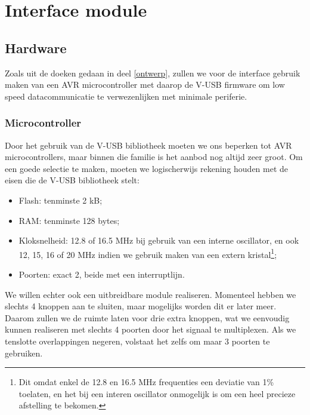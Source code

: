\documentclass[verslag.tex]{subfiles}
\begin{document}
\part{Interface module}
\label{interface}

\chapter{Hardware}

Zoals uit de doeken gedaan in deel \ref{ontwerp}, zullen we voor de interface gebruik maken van een AVR microcontroller met daarop de V-USB firmware om low speed datacommunicatie te verwezenlijken met minimale periferie.

\section{Microcontroller}

Door het gebruik van de V-USB bibliotheek moeten we ons beperken tot AVR microcontrollers, maar binnen die familie is het aanbod nog altijd zeer groot. Om een goede selectie te maken, moeten we logischerwijs rekening houden met de eisen die de V-USB bibliotheek stelt:
\begin{itemize}
\item Flash: tenminste 2 kB;
\item RAM: tenminste 128 bytes;
\item Kloksnelheid: 12.8 of 16.5 MHz bij gebruik van een interne oscillator, en ook 12, 15, 16 of 20 MHz indien we gebruik maken van een extern kristal\footnote{Dit omdat enkel de 12.8 en 16.5 MHz frequenties een deviatie van 1\% toelaten, en het bij een interen oscillator onmogelijk is om een heel precieze afstelling te bekomen.};
\item Poorten: exact 2, beide met een interruptlijn.
\end{itemize}

We willen echter ook een uitbreidbare module realiseren. Momenteel hebben we slechts 4 knoppen aan te sluiten, maar mogelijks worden dit er later meer. Daarom zullen we de ruimte laten voor drie extra knoppen, wat we eenvoudig kunnen realiseren met slechts 4 poorten door het signaal te multiplexen. Als we tenslotte overlappingen negeren, volstaat het zelfs om maar 3 poorten te gebruiken.
\end{document}
